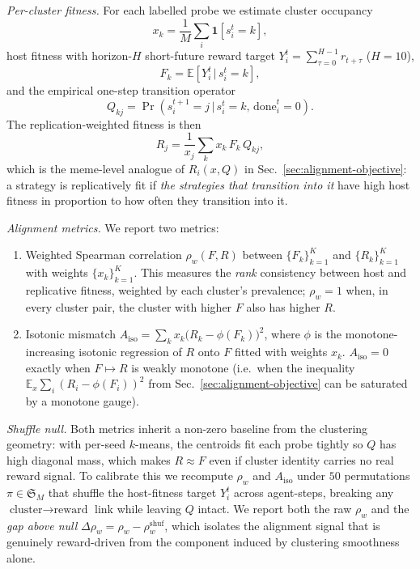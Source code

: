 \emph{Per-cluster fitness.} For each labelled probe we estimate cluster
occupancy
\begin{equation}
  x_k = \frac{1}{M}\sum_i\mathbf{1}[s_i^t=k],
  \label{eq:occ}
\end{equation}
host fitness with horizon-$H$ short-future reward target
$Y_i^t=\sum_{\tau=0}^{H-1}r_{t+\tau}$ ($H\!=\!10$),
\begin{equation}
  F_k = \mathbb{E}\!\left[Y_i^t \,\big|\, s_i^t=k\right],
  \label{eq:F}
\end{equation}
and the empirical one-step transition operator
\begin{equation}
  Q_{kj} = \Pr\!\left(s_i^{t+1}\!=\!j \,\big|\, s_i^t\!=\!k,\,\text{done}_i^t\!=\!0\right).
  \label{eq:Q}
\end{equation}
The replication-weighted fitness is then
\begin{equation}
  R_j = \frac{1}{x_j}\sum_{k} x_k\,F_k\,Q_{kj},
  \label{eq:R}
\end{equation}
which is the meme-level analogue of $R_i(x,Q)$ in
Sec.~\ref{sec:alignment-objective}: a strategy is replicatively fit if
\emph{the strategies that transition into it} have high host fitness in
proportion to how often they transition into it.

\emph{Alignment metrics.} We report two metrics:
\begin{enumerate}\setlength{\itemsep}{1pt}
\item Weighted Spearman correlation $\rho_w(F,R)$ between $\{F_k\}_{k=1}^K$
and $\{R_k\}_{k=1}^K$ with weights $\{x_k\}_{k=1}^K$. This measures the
\emph{rank} consistency between host and replicative fitness, weighted by
each cluster's prevalence; $\rho_w\!=\!1$ when, in every cluster pair, the
cluster with higher $F$ also has higher $R$.
\item Isotonic mismatch
$A_{\mathrm{iso}} = \sum_k x_k\bigl(R_k - \phi(F_k)\bigr)^2$, where $\phi$
is the monotone-increasing isotonic regression of $R$ onto $F$ fitted with
weights $x_k$. $A_{\mathrm{iso}}\!=\!0$ exactly when $F\!\mapsto\!R$ is
weakly monotone (i.e.\ when the inequality
$\mathbb{E}_x\!\sum_i (R_i-\phi(F_i))^2$ from
Sec.~\ref{sec:alignment-objective} can be saturated by a monotone gauge).
\end{enumerate}

\emph{Shuffle null.} Both metrics inherit a non-zero baseline from the
clustering geometry: with per-seed $k$-means, the centroids fit each probe
tightly so $Q$ has high diagonal mass, which makes $R\!\approx\!F$ even if
cluster identity carries no real reward signal. To calibrate this we
recompute $\rho_w$ and $A_{\mathrm{iso}}$ under $50$ permutations
$\pi\in\mathfrak{S}_M$ that shuffle the host-fitness target $Y_i^t$ across
agent-steps, breaking any $\text{cluster}\!\to\!\text{reward}$ link while
leaving $Q$ intact. We report both the raw $\rho_w$ and the
\emph{gap above null} $\Delta\rho_w = \rho_w - \rho_w^{\text{shuf}}$, which
isolates the alignment signal that is genuinely reward-driven from the
component induced by clustering smoothness alone.

